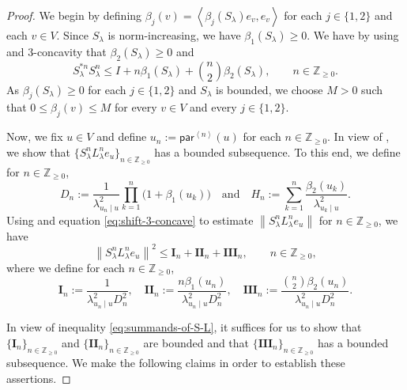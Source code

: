 \documentclass[11pt, reqno, a4paper]{amsart}
\theoremstyle{definition}
\newcommand{\ip}[1]{\left\langle #1 \right\rangle}
\newcommand{\norm}[1]{\left\lVert #1 \right\rVert}
\renewcommand{\le}{\leqslant}
\renewcommand{\ge}{\geqslant}
\newcommand{\Z}{\mathbb Z}
\newcommand{\pr}{\mathsf{par}}
\numberwithin{equation}{section}
\begin{document}
\begin{proof}
    We begin by defining $\beta_j (v) = \ip{\beta_j (S_{\lambda})e_v, e_v}$ for each $j \in \{1,2\}$ and each $v\in  V$. Since $S_{\lambda}$ is norm-increasing, we have $\beta_1 (S_{\lambda}) \ge 0$. We have by using  and $3$-concavity that $\beta_2 (S_{\lambda}) \ge 0$ and 
    \begin{equation}
        S_{\lambda}^{*n}S_{\lambda}^{n} \le I + n \beta_1 (S_{\lambda}) + \binom{n}{2} \beta_2 (S_{\lambda}), \qquad n \in \Z_{\ge 0}.
        \label{eq:shift-3-concave}
    \end{equation}
    As $\beta_j (S_\lambda) \ge 0$ for each $j \in \{1,2\}$ and $S_{\lambda}$ is bounded, we choose $M > 0$ such that $0 \le \beta_j (v) \le M$ for every $v \in  V$ and every $j \in \{1,2\}$.

    Now, we fix $u \in  V$ and define $u_n := \pr^{\ip{n}} (u)$ for each $n \in \Z_{\ge 0}$. In view of , we show that $\{ S_{\lambda} ^{n} L_{\lambda} ^{n} e_u \}_{n \in \Z_{\ge 0}}$ has a bounded subsequence. To this end, we define for $n \in \Z_{\ge 0}$,
    \begin{equation*} 
    D_n := \frac{1}{\lambda_{u_n\mid u} ^{2}} \prod_{k=1}^{n}\bigl(1+\beta_1(u_k)\bigr)\quad \text{and} \quad
    H_n := \sum_{k=1}^{n} \frac{\beta_2(u_k)}{\lambda_{u_k\mid u} ^{2}}.
    \end{equation*}
    Using  and equation \eqref{eq:shift-3-concave} to estimate $\norm{S_{\lambda} ^{n} L_{\lambda} ^{n} e_u}$ for $n \in \Z_{\ge 0}$, we have
    \begin{equation} 
           \norm{S_{\lambda} ^{n} L_{\lambda}^{n} e_u} ^2 \le \mathbf{I}_n + \mathbf{II}_n + \mathbf{III}_n, \qquad n \in \Z_{\ge 0},
           \label{eq:summands-of-S-L}
    \end{equation}
    where we define for each $n \in \Z_{\ge 0}$,
    \begin{equation*}
        \mathbf{I}_n  := \frac{1}{\lambda_{u_n \mid u} ^{2} D_{n}^{2}}, \quad \mathbf{II}_n := \frac{n \beta_1 (u_n)}{\lambda_{u_n \mid u} ^{2} D_{n}^{2}}, \quad \mathbf{III}_n := \frac{\binom{n}{2} \beta_2 (u_n)}{\lambda_{u_n \mid u} ^{2} D_{n}^{2}}.
    \end{equation*}

    In view of inequality \eqref{eq:summands-of-S-L}, it suffices for us to show that $\{ \mathbf{I}_n \}_{n\in\Z_{\ge 0}}$ and $\{ \mathbf{II}_n \}_{n\in\Z_{\ge 0}}$  are bounded and that $\{ \mathbf{III}_n \}_{n\in\Z_{\ge 0}}$  has a bounded subsequence. We make the following claims in order to establish these assertions.


\end{proof}
\end{document}
